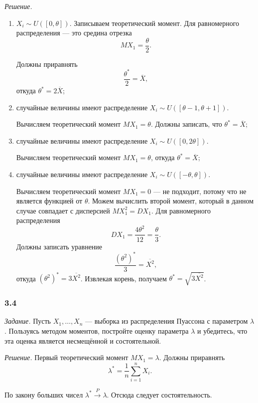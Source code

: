 \textit{Решение.}
\begin{enumerate}[label=\alph*)]
  \item $X_i \sim U \left( \left[ 0, \theta \right] \right) $.
  Записываем теоретический момент.
  Для равномерного распределения --- это средина отрезка
  $$MX_1 =
    \frac{ \theta }{2}.$$

  Должны приравнять
  $$ \frac{ \theta^*}{2} =
    \overline{X},$$
  откуда $ \theta^* = 2 \overline{X} $;
  \item случайные величины имеют распределение
  $X_i \sim
    U \left( \left[ \theta - 1, \theta + 1 \right] \right) $.

  Вычисляем теоретический момент $MX_1 = \theta $.
  Должны записать, что $ \theta^* = \overline{X}$;
  \item случайные величины имеют распределение
  $X_i \sim
    U \left( \left[ 0, 2 \theta \right] \right) $.

  Вычисляем теоретический момент $MX_1 = \theta $, откуда $ \theta^* = \overline{X}$;
  \item случайные величины имеют распределение
  $X_i \sim
    U \left( \left[ - \theta, \theta \right] \right) $.

  Вычисляем теоретический момент $MX_1 = 0$ --- не подходит,
  потому что не является функцией от $ \theta $.
  Можем вычислить второй момент, который в данном случае совпадает с дисперсией $MX_1^2 = DX_1$.
  Для равномерного распределения
  $$DX_1 =
    \frac{4 \theta^2}{12} =
    \frac{ \theta }{3}.$$
  Должны записать уравнение
  $$ \frac{ \left( \theta^2 \right)^*}{3} =
    \overline{X^2},$$
  откуда $ \left( \theta^2 \right)^* = 3 \overline{X^2}$.
  Извлекая корень, получаем $ \theta^* = \sqrt{3 \overline{X^2}}$.
\end{enumerate}

\subsubsection*{3.4}

\textit{Задание.}
Пусть $X_1, \dotsc, X_n$ --- выборка из распределения Пуассона с параметром $ \lambda $.
Пользуясь методом моментов, постройте оценку параметра $ \lambda $ и убедитесь,
что эта оценка является несмещённой и состоятельной.

\textit{Решение.} Первый теоретический момент $MX_1 = \lambda $.
Должны приравнять
$$ \lambda^* =
  \frac{1}{n} \sum \limits_{i = 1}^n X_i.$$

По закону больших чисел $ \lambda^* \overset{P}{ \to } \lambda $.
Отсюда следует состоятельность.

